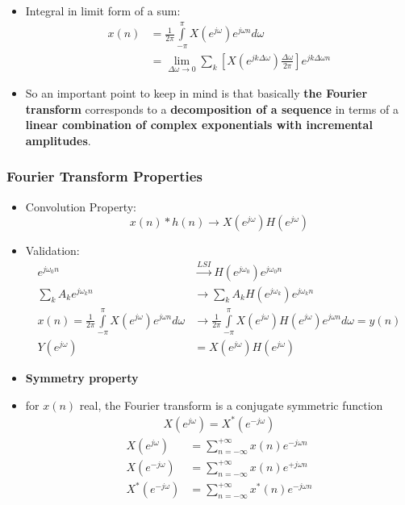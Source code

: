 \documentclass[pdflatex,compress,mathserif]{beamer}
\begin{document}
\begin{frame}
	\begin{itemize}
		\item Integral in limit form of a sum:
		\begin{align*}
		x(n) &= \frac{1}{2\pi}\int\limits_{-\pi}^{\pi}X(e^{j \omega}) e^{j \omega n} d\omega \\
		&= \lim\limits_{\Delta \omega \rightarrow 0} \sum\limits_{k} \left[ X(e^{jk\Delta \omega})\frac{\Delta \omega}{2 \pi} \right] e^{jk\Delta \omega n}
		\end{align*}
		\item So an important point to keep in mind is that basically \textbf{the Fourier transform} corresponds to a \textbf{decomposition of a sequence} in terms of a \textbf{linear combination of complex exponentials with incremental amplitudes}.
	\end{itemize}
\end{frame}

\begin{frame}
	\frametitle{Fourier Transform Properties}
	\begin{itemize}
		\item Convolution Property:
		\[ x(n)*h(n) \rightarrow X(e^{j \omega})H(e^{j \omega}) \]
		\item Validation:
		\begin{align*}
		e^{j \omega_0 n} &\xrightarrow{LSI} H(e^{j \omega_0})e^{j\omega_0 n} \\
		\sum_k A_k e^{j \omega_k n} &\rightarrow \sum_k A_k H(e^{j \omega_k}) e^{j \omega_k n} \\
		x(n) = \frac{1}{2\pi}\int\limits_{-\pi}^{\pi}X(e^{j \omega}) e^{j \omega n} d\omega &\rightarrow \frac{1}{2\pi} \int\limits_{-\pi}^{\pi}X(e^{j \omega}) H(e^{j \omega}) e^{j \omega n} d\omega = y(n) \\
		Y(e^{j \omega}) &= X(e^{j\omega})H(e^{j\omega})
		\end{align*}
	\end{itemize}
\end{frame}

\begin{frame}
	\begin{itemize}
		\item \textbf{Symmetry property}
		\item[] for $ x(n) $ real, the Fourier transform is a conjugate symmetric function
		\begin{align*}
			X(e^{j\omega}) = X^*(e^{-j\omega})
		\end{align*}
		\begin{align*}
		X(e^{j\omega}) &= \sum_{n = -\infty}^{+\infty} x(n) e^{-j\omega n} \\
		X(e^{-j\omega}) &= \sum_{n = -\infty}^{+\infty} x(n) e^{+j\omega n} \\
		X^*(e^{-j\omega}) &= \sum_{n = -\infty}^{+\infty} x^*(n) e^{-j\omega n} \\
		\end{align*}
	\end{itemize}
\end{frame}
\end{document}
